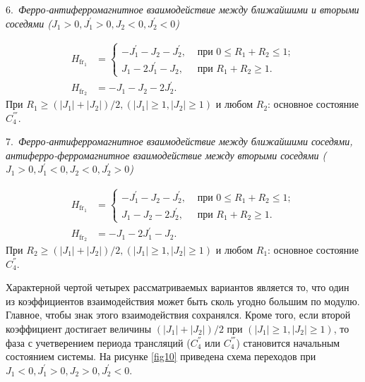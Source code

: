 6.~\emph{Ферро-антиферромагнитное взаимодействие между ближайшими и вторыми соседями ($J_1>0, J_{1}^{'}>0, J_{2}<0, J_{2}^{'}<0$)}

\[
\begin{aligned}
H_{\text{fr}_1}&=
\begin{cases}
-J_1^{'}-J_2-J_2^{'}, & \text{ при } 0\leq R_1+R_2\leq 1 ; \\
J_1-2J_1^{'}-J_2,   & \text{ при }  R_1+R_2\ge 1.
\end{cases}\\
H_{\text{fr}_2}&= -J_1-J_2-2J_2^{'}.
\end{aligned}
\]
При $R_1\ge (|J_1|+|J_2|)/2, (|J_1|\ge 1, |J_2|\ge 1)$ и любом $R_2$: основное состояние $C_4^{'''}$.

7.~\emph{Ферро-антиферромагнитное взаимодействие между ближайшими соседями, антиферро-ферромагнитное взаимодействие между вторыми соседями ($J_1>0, J_{1}^{'}<0, J_{2}<0, J_{2}^{'}>0$) }

\[
\begin{aligned}
H_{\text{fr}_1}&=
\begin{cases}
-J_1^{'}-J_2-J_2^{'}, & \text{ при } 0\leq R_1+R_2\leq 1 ; \\
J_1-J_2-2J_2^{'},   & \text{ при }  R_1+R_2\ge 1.
\end{cases}\\
H_{\text{fr}_2}&= -J_1-2J_1^{'}-J_2.
\end{aligned}
\]
При $R_2\ge (|J_1|+|J_2|)/2, (|J_1|\ge 1, |J_2|\ge 1)$ и любом $R_1$: основное состояние $C_4^{''}$.


Характерной чертой четырех рассматриваемых вариантов является то, что один из коэффициентов взаимодействия может быть сколь угодно большим по модулю. Главное, чтобы знак этого взаимодействия сохранялся. Кроме того, если второй коэффициент достигает величины $(|J_1| + |J_2|)/2$ при $(|J_1| \ge 1, |J_2| \ge 1)$, то фаза с учетверением периода трансляций ($C_4^{''}$ или
$C_4^{'''}$) становится начальным состоянием системы.  На рисунке \ref{fig10} приведена схема переходов при $J_1 < 0, J_1^{'} > 0, J_2 > 0, J_2^{'} < 0$.

